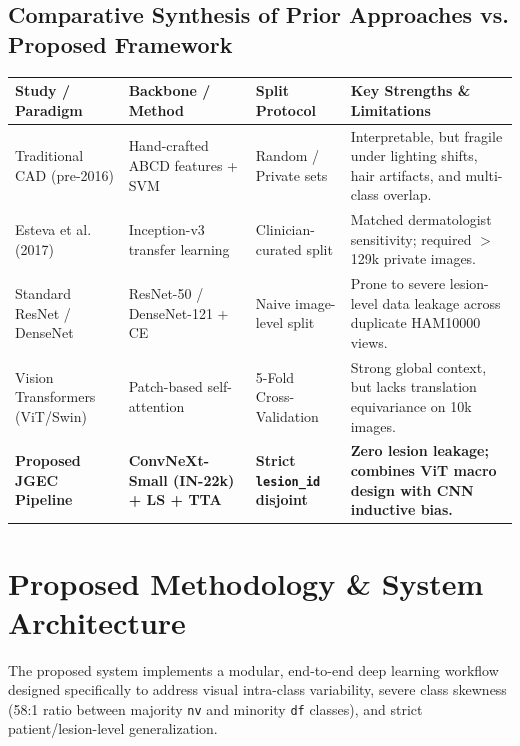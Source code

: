 \documentclass[12pt,a4paper]{article}
\begin{document}
\subsection{Comparative Synthesis of Prior Approaches vs. Proposed Framework}
\begin{table}[h!]
\centering
\renewcommand{\arraystretch}{1.25}
\begin{tabularx}{\textwidth}{l l l X}
\toprule
\textbf{Study / Paradigm} & \textbf{Backbone / Method} & \textbf{Split Protocol} & \textbf{Key Strengths \& Limitations} \\
\midrule
Traditional CAD (pre-2016) & Hand-crafted ABCD features + SVM & Random / Private sets & Interpretable, but fragile under lighting shifts, hair artifacts, and multi-class overlap. \\
Esteva et al. (2017) & Inception-v3 transfer learning & Clinician-curated split & Matched dermatologist sensitivity; required $>$129k private images. \\
Standard ResNet / DenseNet & ResNet-50 / DenseNet-121 + CE & Naive image-level split & Prone to severe lesion-level data leakage across duplicate HAM10000 views. \\
Vision Transformers (ViT/Swin) & Patch-based self-attention & 5-Fold Cross-Validation & Strong global context, but lacks translation equivariance on 10k images. \\
\textbf{Proposed JGEC Pipeline} & \textbf{ConvNeXt-Small (IN-22k) + LS + TTA} & \textbf{Strict \texttt{lesion\_id} disjoint} & \textbf{Zero lesion leakage; combines ViT macro design with CNN inductive bias.} \\
\bottomrule
\end{tabularx}
\end{table}

\section{Proposed Methodology \& System Architecture}
The proposed system implements a modular, end-to-end deep learning workflow designed specifically to address visual intra-class variability, severe class skewness (58:1 ratio between majority \texttt{nv} and minority \texttt{df} classes), and strict patient/lesion-level generalization.
\end{document}
